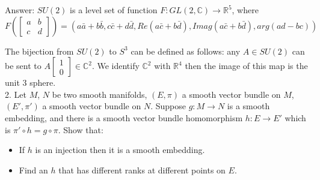 \documentclass{article}
\theoremstyle{definition}
\begin{document}
Answer: $SU(2)$ is a level set of function $F: GL(2, \mathbb{C})\rightarrow \mathbb{R}^5$, where \[F(\left[\begin{array}{cc}a & b\\ c & d\end{array}\right])=(a\bar{a}+b\bar{b}, c\bar{c}+d\bar{d}, Re(a\bar{c}+b\bar{d}), Imag(a\bar{c}+b\bar{d}), arg(ad-bc))\]

The bijection from $SU(2)$ to $S^3$ can be defined as follows: any $A\in SU(2)$ can be sent to $A\left[\begin{array}{c}1\\0\end{array}\right]\in \mathbb{C}^2$. We identify $\mathbb{C}^2$ with $\mathbb{R}^4$ then the image of this map is the unit $3$ sphere.\\

2. Let $M$, $N$ be two smooth manifolds, $(E, \pi)$ a smooth vector bundle on $M$, $(E', \pi')$ a smooth vector bundle on $N$. Suppose $g: M\rightarrow N$ is a smooth embedding, and there is a smooth vector bundle homomorphism $h: E\rightarrow E'$ which is $\pi'\circ h=g\circ \pi$. Show that:

\begin{itemize}
    \item If $h$ is an injection then it is a smooth embedding.
    \item Find an $h$ that has different ranks at different points on $E$.
\end{itemize}
\end{document}
